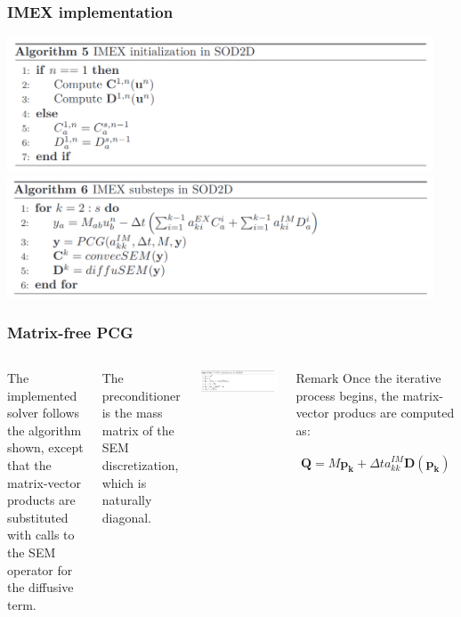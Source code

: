     \begin{frame}
      \frametitle{IMEX implementation}
      
      \includegraphics[width=0.95\textwidth]{images/imexSOD_init.png}
      \includegraphics[width=0.95\textwidth]{images/imexSOD_steps.png}
      
    \end{frame}
      
    \begin{frame}
    \frametitle{Matrix-free PCG}
    
    \begin{columns}
    
    
    The implemented solver follows the algorithm shown, except that the matrix-vector products are substituted with calls to the SEM operator for the diffusive term.
    
    The preconditioner is the mass matrix of the SEM discretization, which is naturally diagonal.
    
    \includegraphics[width=1.1\textwidth]{images/pcgSOD_init.png}
    
    \begin{block}{Remark}
        Once the iterative process begins, the matrix-vector producs are computed as:
    
        \begin{align*}
            \mathbf{Q}  = M \mathbf{p_k} + \Delta t a^{IM}_{kk} \mathbf{D} (\mathbf{p_k})
    \end{align*}
    
    \end{block}
    
    \end{columns}
    
    \end{frame}